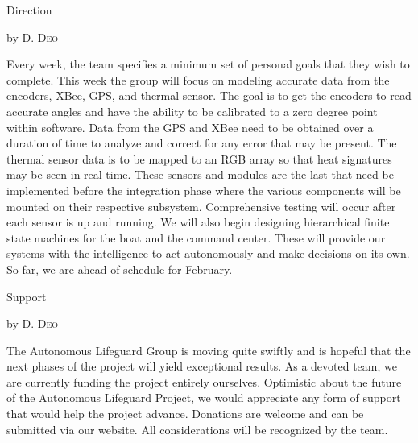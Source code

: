 \documentclass[10pt,a4paper]{article}
\newcommand{\NewsItem}[1]{%
		\usefont{T1}{augie}{m}{n} 	
		\large #1 \vspace{4pt}
		\par \normalsize \normalfont}
\newcommand{\NewsAuthor}[1]{%
			\hfill by \textsc{#1} \vspace{4pt}
			\par \normalfont}
\begin{document}
\begin{multicols}{3}

\vspace{1cm}
\NewsItem{Direction}
\NewsAuthor{D. Deo}
	Every week, the team specifies a minimum set of personal goals that they wish to complete.
 This week the group will focus on modeling accurate data from the encoders, XBee, GPS, and thermal sensor. The goal is to get the encoders to read accurate angles and have the ability to be calibrated to a zero degree point within software. Data from the GPS and XBee need to be obtained over a duration of time to analyze and correct for any error that may be present. The thermal sensor data is to be mapped to an RGB array so that heat signatures may be seen in real time. These sensors and modules are the last that need be implemented before the integration phase where the various components will be mounted on their respective subsystem. Comprehensive testing will occur after each sensor is up and running. We will also begin designing hierarchical finite state machines for the boat and the command center. These will provide our systems with the intelligence to act autonomously and make decisions on its own. So far, we are ahead of schedule for February.

\vspace{1cm}
\NewsItem{Support}
\NewsAuthor{D. Deo}
The Autonomous Lifeguard Group is moving quite swiftly and is hopeful that the next phases of the project will yield exceptional results. As a devoted team, we are currently funding the project entirely ourselves. Optimistic about the future of the Autonomous Lifeguard Project, we would appreciate any form of support that would help the project advance. Donations are welcome and can be submitted via our website. All considerations will be recognized by the team.
\end{multicols}
\end{document}
